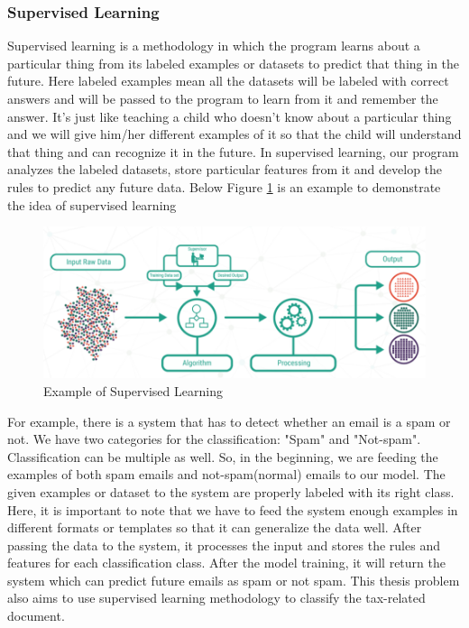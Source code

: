 \subsubsection{Supervised Learning}
\par
Supervised learning is a methodology in which the program learns about a particular thing from its labeled examples or datasets to predict that thing in the future. Here labeled examples mean all the datasets will be labeled with correct answers and will be passed to the program to learn from it and remember the answer. It's just like teaching a child who doesn't know about a particular thing and we will give him/her different examples of it so that the child will understand that thing and can recognize it in the future. In supervised learning, our program analyzes the labeled datasets, store particular features from it and develop the rules to predict any future data. Below Figure \ref{ex-sl} is an example to demonstrate the idea of supervised learning
\begin{figure}[H]
\centering
\includegraphics[scale=0.8]{images/Chapter2/supervised-learning-2.PNG}
\caption{Example of Supervised Learning \cite{sup_unsup_learning}}
\label{ex-sl}
\end{figure}
\par
For example, there is a system that has to detect whether an email is a spam or not. We have two categories for the classification: "Spam" and "Not-spam". Classification can be multiple as well. So, in the beginning, we are feeding the examples of both spam emails and not-spam(normal) emails to our model. The given examples or dataset to the system are properly labeled with its right class. Here, it is important to note that we have to feed the system enough examples in different formats or templates so that it can generalize the data well. After passing the data to the system, it processes the input and stores the rules and features for each classification class. After the model training, it will return the system which can predict future emails as spam or not spam. This thesis problem also aims to use supervised learning methodology to classify the tax-related document. 
